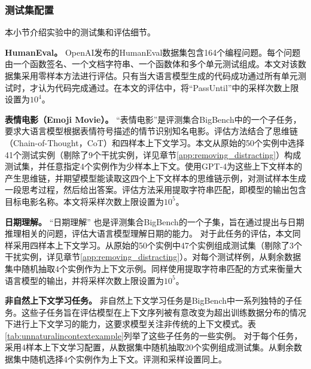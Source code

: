 \subsubsection{测试集配置}
\label{app:testset}
本小节介绍实验中的测试集和评估细节。

\textbf{HumanEval。}
\label{app:humaneval}
OpenAI发布的HumanEval\citep{chen2021evaluating}数据集包含164个编程问题。每个问题由一个函数签名、一个文档字符串、一个函数体和多个单元测试组成。本文对该数据集采用零样本方法进行评估。只有当大语言模型生成的代码成功通过所有单元测试时，才认为代码完成通过。在本文的评估中，将“PassUntil”中的采样次数上限设置为\(10^4\)。

\textbf{表情电影（Emoji Movie）。}
\label{app:emoji_movies}
“表情电影”是评测集合BigBench\citep{srivastava2022beyond}中的一个子任务，要求大语言模型根据表情符号描述的情节识别知名电影。评估方法结合了思维链（Chain-of-Thought，CoT）和四样本上下文学习。本文从原始的50个实例中选择41个测试实例（剔除了9个干扰实例，详见章节\ref{app:removing_distracting}）构成测试集，并任意指定4个实例作为少样本上下文。使用GPT-4为这些上下文样本的产生思维链，并期望模型能读取这四个上下文样本的思维链示例，对测试样本生成一段思考过程，然后给出答案。评估方法采用提取字符串匹配，即模型的输出包含目标电影名称。本文将采样次数上限设置为\(10^5\)。 

\textbf{日期理解。}
\label{app:dateunderstanding}
“日期理解” 也是评测集合BigBench\citep{srivastava2022beyond}的一个子集，旨在通过提出与日期推理相关的问题，评估大语言模型理解日期的能力。
对于此任务的评估，本文同样采用四样本上下文学习。从原始的50个实例中47个实例组成测试集（剔除了3个干扰实例，详见章节\ref{app:removing_distracting}）。对每个测试样例，从剩余数据集中随机抽取4个实例作为上下文示例。同样使用提取字符串匹配的方式来衡量大语言模型的输出，并将采样次数上限设置为\(10^5\)。

\textbf{非自然上下文学习任务。}
\label{app:unantural_in_context_learning}
非自然上下文学习任务是BigBench\citep{srivastava2022beyond}中一系列独特的子任务。这些子任务旨在评估模型在上下文序列被有意改变为超出训练数据分布的情况下进行上下文学习的能力，这要求模型关注非传统的上下文模式。表\ref{tab:unnaturalincontextexample}列举了这些子任务的一些实例。
对于每个任务，采用4样本上下文学习配置，从数据集中随机抽取20个实例组成测试集。从剩余数据集中随机选择4个实例作为上下文。评测和采样设置同上。

